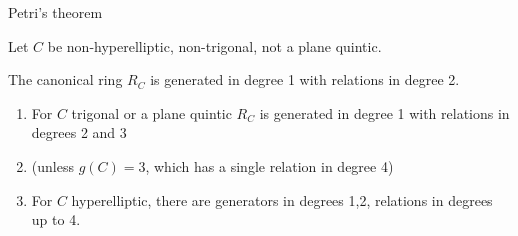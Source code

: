 \begin{frame}{Petri's theorem}

    Let $C$ be non-hyperelliptic, non-trigonal, not a plane quintic.

  \begin{theorem}
  The canonical ring $R_C$ is generated in degree 1 with relations in degree 2.
  \end{theorem}

  \begin{remark}
    \begin{enumerate}
    \item For $C$ trigonal or a plane quintic $R_C$ is generated in degree 1 with relations in degrees 2 and 3
    \item (unless $g(C) = 3$, which has a single relation in degree 4)
    \item For $C$ hyperelliptic, there are generators in degrees 1,2, relations in degrees up to 4.
    \end{enumerate}
  \end{remark}


\end{frame}
